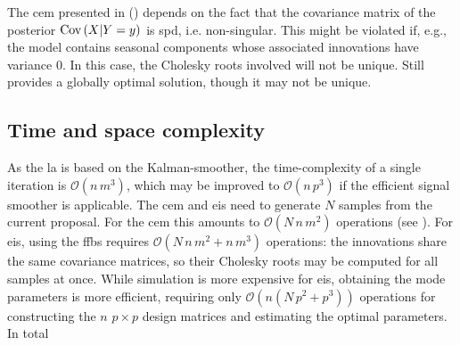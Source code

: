 The \gls{cem} presented in  () depends on the fact that the covariance matrix of the posterior $\text{Cov} \left( X | Y = y \right)$ is \gls{spd}, i.e. non-singular. This might be violated if, e.g., the model contains seasonal components whose associated innovations have variance $0$. In this case, the Cholesky roots involved will not be unique. Still  provides a globally optimal solution, though it may not be unique. 

\subsection{Time and space complexity}
As the \gls{la} is based on the Kalman-smoother, the time-complexity of a single iteration is $\mathcal O(n\,m^{3})$, which may be improved to  $\mathcal O(n\,p^{3})$ if the efficient signal smoother is applicable. The \gls{cem} and \gls{eis} need to generate $N$ samples from the current proposal. For the \gls{cem} this amounts to $\mathcal O(N\,n\, m^{2})$ operations (see ). For \gls{eis}, using the \gls{ffbs} requires $\mathcal O (N\,n\,m^2 + n\,m^{3})$ operations: the innovations share the same covariance matrices, so their Cholesky roots may be computed for all samples at once. While simulation is more expensive for \gls{eis}, obtaining the mode parameters is more efficient, requiring only $\mathcal O(n(N\,p^2 + p^{3}))$ operations for constructing the $n$ $p\times p$ design matrices and estimating the optimal parameters. In total  

